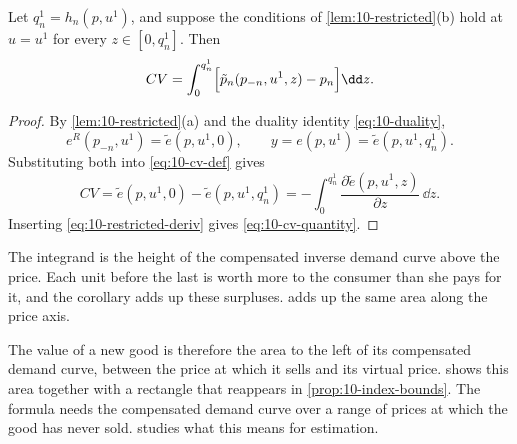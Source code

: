 \begin{corollary}\label{cor:10-cv-quantity}
Let $q_n^1 = h_n(p,u^1)$, and suppose the conditions of \cref{lem:10-restricted}(b) hold at $u = u^1$ for every
$z \in [0,q_n^1]$. Then
\begin{equation}\label{eq:10-cv-quantity}
  CV = \int_0^{q_n^1}\Bigl[\tilde p_n(p_{-n},u^1,z) - p_n\Bigr]\dd z .
\end{equation}
\end{corollary}

\begin{proof}
By \cref{lem:10-restricted}(a) and the duality identity \eqref{eq:10-duality},
\begin{equation*}
  e^R(p_{-n},u^1) = \tilde e(p,u^1,0), \qquad y = e(p,u^1) = \tilde e(p,u^1,q_n^1).
\end{equation*}
Substituting both into \eqref{eq:10-cv-def} gives
\begin{equation*}
  CV = \tilde e(p,u^1,0) - \tilde e(p,u^1,q_n^1) = -\int_0^{q_n^1}\frac{\partial\tilde e(p,u^1,z)}{\partial z}\,\dd z .
\end{equation*}
Inserting \eqref{eq:10-restricted-deriv} gives \eqref{eq:10-cv-quantity}.
\end{proof}

The integrand is the height of the compensated inverse demand curve above the price. Each unit before the last
is worth more to the consumer than she pays for it, and the corollary adds up these surpluses.
 adds up the same area along the price axis.

The value of a new good is therefore the area to the left of its compensated demand curve, between the price
at which it sells and its virtual price.  shows this area together with a rectangle that
reappears in \cref{prop:10-index-bounds}. The formula needs the compensated demand curve over a range of
prices at which the good has never sold.  studies what this means for estimation.

